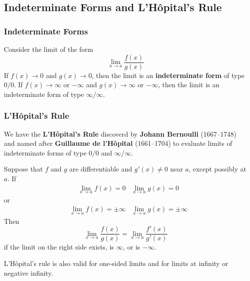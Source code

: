 \subsection{Indeterminate Forms and L'Hôpital's Rule}
\subsubsection{Indeterminate Forms}
Consider the limit of the form \[\lim_{x\to a}\frac{f(x)}{g(x)}\]
If \(f(x)\to 0\) and \(g(x)\to 0\), then the limit is an
\textbf{indeterminate form} of type \(0/0\).
If \(f(x)\to\infty\) or \(-\infty\) and \(g(x)\to\infty\) or \(-\infty\),
then the limit is an indeterminate form of type \(\infty/\infty\).

\subsubsection{L'Hôpital's Rule}
We have the \textbf{L'Hôpital's Rule} discoverd by
\textbf{Johann Bernoulli} (1667--1748) and named after
\textbf{Guillaume de l'Hôpital} (1661--1704) to evaluate limits of indeterminate
forms of type \(0/0\) and \(\infty/\infty\).
\begin{theorem}
    Suppose that \(f\) and \(g\) are differentiable and \(g'(x)\neq 0\) near \(a\),
    except possibly at \(a\).
    If
    \begin{align*}
        &\lim_{x\to a}f(x)=0&\lim_{x\to a}g(x)=0
    \end{align*}
    or
    \begin{align*}
        &\lim_{x\to a}f(x)=\pm\infty&\lim_{x\to a}g(x)=\pm\infty
    \end{align*}
    Then
    \[\lim_{x\to a}\frac{f(x)}{g(x)}=\lim_{x\to a}\frac{f'(x)}{g'(x)}\]
    if the limit on the right side exists, is \(\infty\), or is \(-\infty\).
\end{theorem}
L'Hôpital's rule is also valid for one-sided limits and for limits at infinity
or negative infinity.